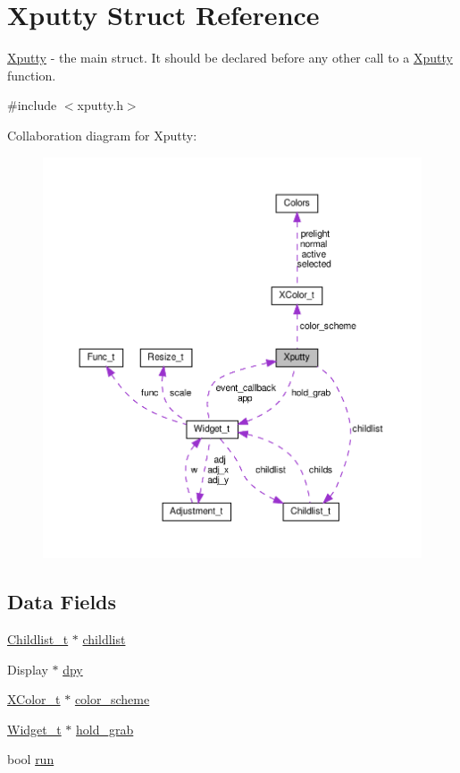 \hypertarget{structXputty}{}\section{Xputty Struct Reference}
\label{structXputty}


\hyperlink{structXputty}{Xputty} -\/ the main struct. It should be declared before any other call to a \hyperlink{structXputty}{Xputty} function.  




{\ttfamily \#include $<$xputty.\+h$>$}



Collaboration diagram for Xputty\+:
\nopagebreak
\begin{figure}[H]
\begin{center}
\leavevmode
\includegraphics[width=350pt]{structXputty__coll__graph}
\end{center}
\end{figure}
\subsection*{Data Fields}
\begin{DoxyCompactItemize}
\item 
\hyperlink{structChildlist__t}{Childlist\+\_\+t} $\ast$ \hyperlink{structXputty_a55fafc08d9702ab14137f52f35c4ff19}{childlist}
\item 
Display $\ast$ \hyperlink{structXputty_ab185ae4fd00ee1930c61e0440734878f}{dpy}
\item 
\hyperlink{structXColor__t}{X\+Color\+\_\+t} $\ast$ \hyperlink{structXputty_aab9298d9341e315b1aa4ac16188c699e}{color\+\_\+scheme}
\item 
\hyperlink{structWidget__t}{Widget\+\_\+t} $\ast$ \hyperlink{structXputty_a744a6ffdff59d8725c863e7ecddfc0e1}{hold\+\_\+grab}
\item 
bool \hyperlink{structXputty_a3a8e0381e77ae9fae69aab5dda8e7e7a}{run}
\end{DoxyCompactItemize}


